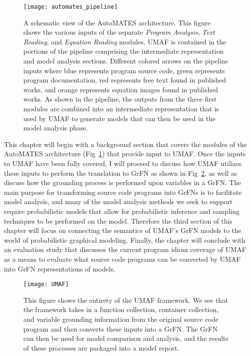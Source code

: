 \begin{figure}[!htbp]
    \centering
    \texttt{[image: automates\_pipeline]}%
    \caption[The AutoMATES Pipeline]{A schematic view of the AutoMATES architecture. This figure shows the various inputs of the separate \textit{Program Analysis}, \textit{Text Reading}, and \textit{Equation Reading} modules. UMAF is contained in the portions of the pipeline comprising the intermediate representation and model analysis sections. Different colored arrows on the pipeline inputs where blue represents program source code, green represents program documentation, red represents free text found in published works, and orange represents equation images found in published works. As shown in the pipeline, the outputs from the three first modules are combined into an intermediate representation that is used by UMAF to generate models that can then be used in the model analysis phase.}
    \label{fig:automates_pipeline}
\end{figure}

This chapter will begin with a background section that covers the modules of the AutoMATES architecture (Fig~\ref{fig:automates_pipeline}) that provide input to UMAF.
Once the inputs to UMAF have been fully covered, I will proceed to discuss how UMAF utilizes these inputs to perform the translation to GrFN as shown in Fig~\ref{fig:umaf_diagram}, as well as discuss how the grounding process is performed upon variables in a GrFN.
The main purpose for transforming source code programs into GrFNs is to facilitate model analysis, and many of the model analysis methods we seek to support require probabilistic models that allow for probabilistic inference and sampling techniques to be performed on the model.
Therefore the third section of this chapter will focus on connecting the semantics of UMAF's GrFN models to the world of probabilistic graphical modeling.
Finally, the chapter will conclude with an evaluation study that discusses the current program idiom coverage of UMAF as a means to evaluate what source code programs can be converted by UMAF into GrFN representations of models.

\begin{figure}[!htbp]
    \centering
    \texttt{[image: UMAF]}%
    \caption[Diagram of UMAF]{This figure shows the entirety of the UMAF framework. We see that the framework takes in a function collection, container collection, and variable grounding information from the original source code program and then converts these inputs into a GrFN. The GrFN can then be used for model comparison and analysis, and the results of these processes are packaged into a model report.}
    \label{fig:umaf_diagram}
\end{figure}

